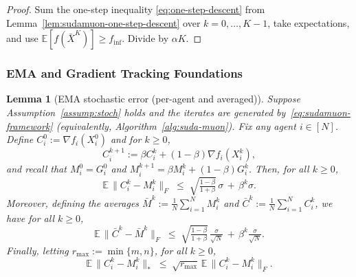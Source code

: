 \documentclass{article}
\newtheorem{lemma}{Lemma}
\begin{document}
\begin{proof}
Sum the one-step inequality \eqref{eq:one-step-descent} from Lemma~\ref{lem:sudamuon-one-step-descent} over $k=0,\dots,K-1$, take expectations, and use $\mathbb{E}[f(\bar X^K)]\ge f_{\inf}$.
Divide by $\alpha K$.
\end{proof}

\subsubsection*{EMA and Gradient Tracking Foundations}

\begin{lemma}[EMA stochastic error (per-agent and averaged)]
\label{lem:sudamuon-ema-stoch-error}
Suppose Assumption~\ref{assump:stoch} holds and the iterates are generated by~\eqref{eq:sudamuon-framework} (equivalently, Algorithm~\ref{alg:suda-muon}).
Fix any agent $i\in[N]$.
Define $C_i^0:=\nabla f_i(X_i^0)$ and for $k\ge 0$,
\[
C_i^{k+1}:=\beta C_i^k+(1-\beta)\nabla f_i(X_i^k),
\]
and recall that $M_i^0=G_i^0$ and $M_i^{k+1}=\beta M_i^k+(1-\beta)G_i^k$.
Then, for all $k\ge 0$,
\begin{equation}
\label{eq:ema-stoch-error-agent}
\mathbb{E}\,\|C_i^k-M_i^k\|_F
\;\le\;
\sqrt{\tfrac{1-\beta}{1+\beta}}\,\sigma \, +\, \beta^k\sigma.
\end{equation}
Moreover, defining the averages $\bar M^k:=\tfrac{1}{N}\sum_{i=1}^N M_i^k$ and $\bar C^k:=\tfrac{1}{N}\sum_{i=1}^N C_i^k$, we have for all $k\ge 0$,
\begin{equation}
\label{eq:ema-stoch-error-average}
\mathbb{E}\,\|\bar C^k-\bar M^k\|_F
\;\le\;
\sqrt{\tfrac{1-\beta}{1+\beta}}\,\tfrac{\sigma}{\sqrt{N}} \, +\, \beta^k\tfrac{\sigma}{\sqrt{N}}.
\end{equation}
Finally, letting $r_{\max}:=\min\{m,n\}$, for all $k\ge 0$,
\begin{equation}
\label{eq:ema-stoch-error-nuc}
\mathbb{E}\,\|C_i^k-M_i^k\|_* \;\le\; \sqrt{r_{\max}}\,\mathbb{E}\,\|C_i^k-M_i^k\|_F.
\end{equation}
\end{lemma}
\end{document}
